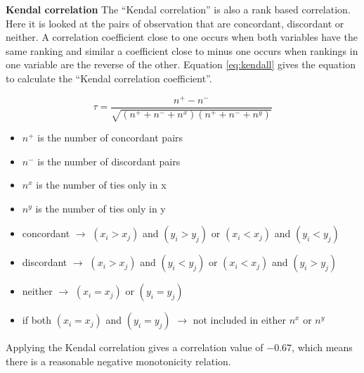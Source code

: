 \textbf{Kendal correlation}
The ``Kendal correlation'' is also a rank based correlation. Here it is looked at the pairs of observation that are concordant, discordant or neither. A correlation coefficient close to one occurs when both variables have the same ranking and similar a coefficient close to minus one occurs when rankings in one variable are the reverse of the other. Equation \ref{eq:kendall} gives the equation to calculate the ``Kendal correlation coefficient''.

\begin{equation}\label{eq:kendall}
	\tau = \frac{n^+-n^-}{\sqrt{(n^++n^-+n^x)(n^++n^-+n^y)}}
\end{equation}
\begin{itemize}
	\item $ n^+ $ is the number of concordant pairs
	\item $ n^- $ is the number of discordant pairs
	\item $ n^x $ is the number of ties only in x
	\item $ n^y $ is the number of ties only in y
	\item concordant $\rightarrow $ $ (x_i > x_j ) $ and $ (y_i > y_j ) $ or $ (x_i < x_j ) $ and $ (y_i < y_j ) $
	\item discordant $\rightarrow $ $ (x_i > x_j ) $ and $ (y_i < y_j ) $ or $ (x_i < x_j ) $ and $ (y_i > y_j ) $
	\item neither $\rightarrow $ $ (x_i = x_j ) $ or $ (y_i = y_j ) $
	\item if both $ (x_i = x_j ) $ and $ (y_i = y_j ) $ $\rightarrow $ not included in either $ n^x $ or $ n^y $
\end{itemize}

Applying the Kendal correlation  gives a correlation value of $ -0.67$, which means there is a reasonable negative monotonicity relation.\\



